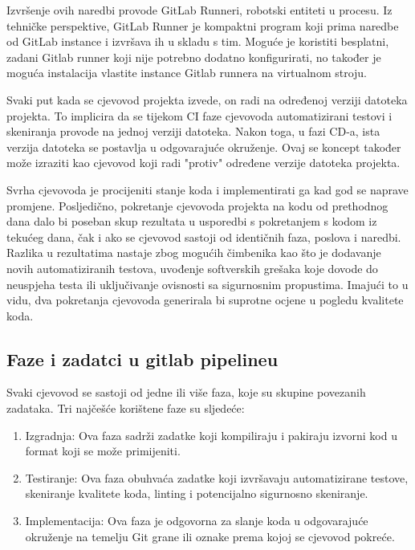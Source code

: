 \documentclass[a4paper,12pt,oneside]{article}
\begin{document}
Izvršenje ovih naredbi provode GitLab Runneri, robotski entiteti u procesu. Iz tehničke perspektive, GitLab Runner je kompaktni program koji prima naredbe od GitLab instance i izvršava ih u skladu s tim. Moguće je koristiti besplatni, zadani Gitlab runner koji nije potrebno dodatno konfigurirati, no također je moguća instalacija vlastite instance Gitlab runnera na virtualnom stroju.

Svaki put kada se cjevovod projekta izvede, on radi na određenoj verziji datoteka projekta. To implicira da se tijekom CI faze cjevovoda automatizirani testovi i skeniranja provode na jednoj verziji datoteka. Nakon toga, u fazi CD-a, ista verzija datoteka se postavlja u odgovarajuće okruženje. Ovaj se koncept također može izraziti kao cjevovod koji radi "protiv" određene verzije datoteka projekta.

Svrha cjevovoda je procijeniti stanje koda i implementirati ga kad god se naprave promjene. Posljedično, pokretanje cjevovoda projekta na kodu od prethodnog dana dalo bi poseban skup rezultata u usporedbi s pokretanjem s kodom iz tekućeg dana, čak i ako se cjevovod sastoji od identičnih faza, poslova i naredbi. Razlika u rezultatima nastaje zbog mogućih čimbenika kao što je dodavanje novih automatiziranih testova, uvođenje softverskih grešaka koje dovode do neuspjeha testa ili uključivanje ovisnosti sa sigurnosnim propustima. Imajući to u vidu, dva pokretanja cjevovoda generirala bi suprotne ocjene u pogledu kvalitete koda.

\subsection{Faze i zadatci u gitlab pipelineu}
Svaki cjevovod se sastoji od jedne ili više faza, koje su skupine povezanih zadataka. Tri najčešće korištene faze su sljedeće:
\begin{enumerate}
\item Izgradnja: Ova faza sadrži zadatke koji kompiliraju i pakiraju izvorni kod u format koji se može primijeniti.

\item Testiranje: Ova faza obuhvaća zadatke koji izvršavaju automatizirane testove, skeniranje kvalitete koda, linting i potencijalno sigurnosno skeniranje.

\item Implementacija: Ova faza je odgovorna za slanje koda u odgovarajuće okruženje na temelju Git grane ili oznake prema kojoj se cjevovod pokreće. 
\end{enumerate}
\end{document}
